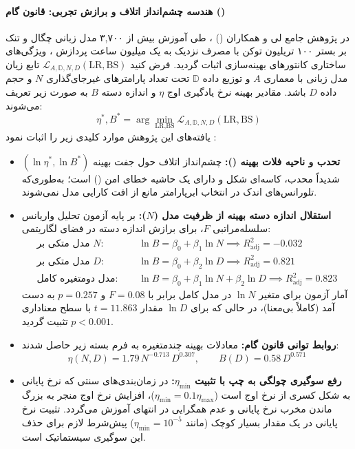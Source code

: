 \paragraph*{هندسه چشم‌انداز اتلاف و برازش تجربی: قانون گام ()}
در پژوهش جامع لی و همکاران () \cite{li2025steplaw}، طی آموزش بیش از ۳,۷۰۰ مدل زبانی چگال و تنک بر بستر ۱۰۰ تریلیون توکن با مصرف نزدیک به یک میلیون ساعت پردازش ، ویژگی‌های ساختاری کانتورهای بهینه‌سازی اثبات گردید. فرض کنید $\mathcal{L}_{A,\mathbb{D},N,D}(\text{LR}, \text{BS})$ تابع زیان مدل زبانی با معماری $A$ و توزیع داده $\mathbb{D}$ تحت تعداد پارامترهای غیرجای‌گذاری $N$ و حجم داده $D$ باشد. مقادیر بهینه نرخ یادگیری اوج $\eta$ و اندازه دسته $B$ به صورت زیر تعریف می‌شوند:
\begin{equation}
    \eta^*, B^* = \arg\min_{\text{LR}, \text{BS}} \mathcal{L}_{A,\mathbb{D},N,D}(\text{LR}, \text{BS})
\end{equation}
یافته‌های این پژوهش موارد کلیدی زیر را اثبات نمود \cite{li2025steplaw}:
\begin{itemize}
    \item \textbf{تحدب و ناحیه فلات بهینه ():} چشم‌انداز اتلاف حول جفت بهینه $(\ln \eta^*, \ln B^*)$ شدیداً محدب، کاسه‌ای شکل و دارای یک حاشیه خطای امن () است؛ به‌طوری‌که تلورانس‌های اندک در انتخاب ابرپارامتر مانع از افت کارایی مدل نمی‌شوند.
    \item \textbf{استقلال اندازه دسته بهینه از ظرفیت مدل ($N$):} بر پایه آزمون تحلیل واریانس سلسله‌مراتبی $F$، برای برازش اندازه دسته در فضای لگاریتمی:
    \begin{align}
        \text{مدل متکی بر } N: \quad & \ln B = \beta_0 + \beta_1 \ln N \implies R^2_{\text{adj}} = -0.032 \\
        \text{مدل متکی بر } D: \quad & \ln B = \beta_0 + \beta_2 \ln D \implies R^2_{\text{adj}} = 0.821 \\
        \text{مدل دومتغیره کامل: } \quad & \ln B = \beta_0 + \beta_1 \ln N + \beta_2 \ln D \implies R^2_{\text{adj}} = 0.823
    \end{align}
    آمار آزمون برای متغیر $\ln N$ در مدل کامل برابر با $F = 0.08$ و $p = 0.257$ به دست آمد (کاملاً بی‌معنا)، در حالی که برای $\ln D$ مقدار $t = 11.863$ با سطح معناداری $p < 0.001$ تثبیت گردید.
    \item \textbf{روابط توانی قانون گام:} معادلات بهینه چندمتغیره به فرم بسته زیر حاصل شدند:
    \begin{equation}
        \eta(N, D) = 1.79 \, N^{-0.713} \, D^{0.307}, \qquad B(D) = 0.58 \, D^{0.571}
    \end{equation}
    \item \textbf{رفع سوگیری چولگی به چپ با تثبیت $\eta_{\min}$:} در زمان‌بندی‌های سنتی که نرخ پایانی به شکل کسری از نرخ اوج است ($\eta_{\min} = 0.1 \eta_{\max}$)، افزایش نرخ اوج منجر به بزرگ ماندن مخرب نرخ پایانی و عدم همگرایی در انتهای آموزش می‌گردد. تثبیت نرخ پایانی در یک مقدار بسیار کوچک (مانند $\eta_{\min} = 10^{-5}$) پیش‌شرط لازم برای حذف این سوگیری سیستماتیک است.
\end{itemize}

